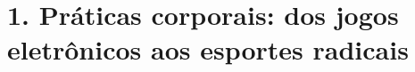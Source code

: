 \blankpage


\chapter{1. Práticas corporais: dos jogos eletrônicos aos esportes radicais}

\vspace*{-2\baselineskip}



